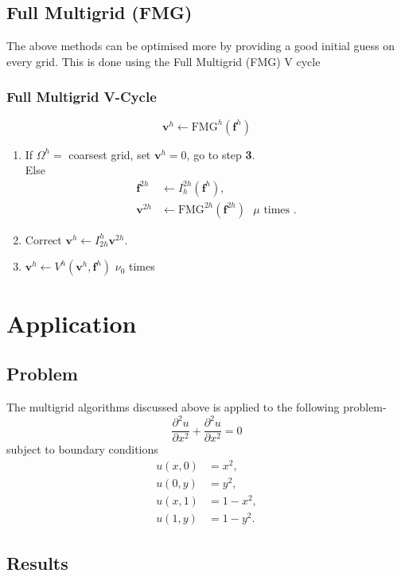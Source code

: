 \documentclass[a4paper]{report}
\begin{document}
	\subsection{Full Multigrid (FMG)}
	The above methods can be optimised more by providing a good initial guess on every grid. This is done using the Full Multigrid (FMG) V cycle
	
	\subsubsection{Full Multigrid V-Cycle}
	$$ \mathbf{v}^h \leftarrow \text{FMG}^h(\mathbf{f}^h) $$
	\begin{enumerate}
	\item If $\Omega^h = $ coarsest grid, set $\mathbf{v}^h = 0$, go to step \textbf{3}. \\
	Else
	\begin{align*}
	\mathbf{f}^{2h} &\leftarrow I_h^{2h}(\mathbf{f}^{h}), \\
	\mathbf{v}^{2h} &\leftarrow \text{FMG}^{2h}(\mathbf{f}^{2h}) \text{ $\mu$ times }.
	\end{align*}
	\item Correct $\mathbf{v}^h \leftarrow I_{2h}^h\mathbf{v}^{2h}$.
	\item $\mathbf{v}^{h} \leftarrow V^h(\mathbf{v}^h, \mathbf{f}^h)$ $\nu_0$ times
	\end{enumerate}
	
	\section{Application}
	
	\subsection{Problem}
	The multigrid algorithms discussed above is applied to the following problem-
	\begin{equation}
	\frac{\partial^2 u}{\partial x^2} + \frac{\partial^2 u}{\partial x^2} = 0
	\end{equation}
	subject to boundary conditions
	\begin{align}
	u(x,0) &= x^2, \\
	u(0,y) &= y^2, \\
	u(x,1) &= 1-x^2, \\
	u(1,y) &= 1-y^2.
	\end{align}
	
	\subsection{Results}
\end{document}
